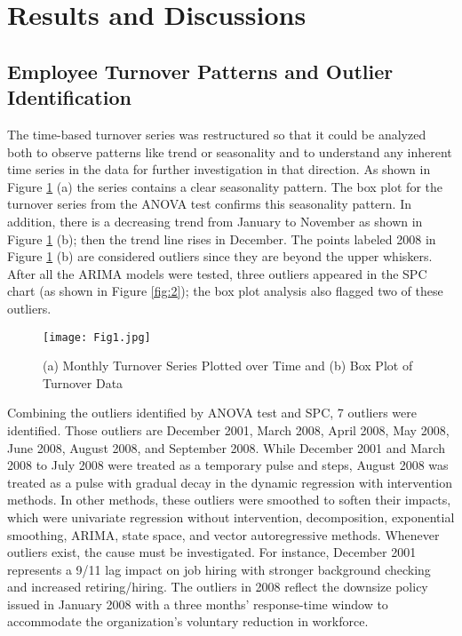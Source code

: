 \section{Results and Discussions}
\subsection{Employee Turnover Patterns and Outlier Identification}
The time-based turnover series was restructured so that it could be analyzed both to observe patterns like trend or seasonality and to understand any inherent time series in the data for further investigation in that direction. 
As shown in Figure \ref{fig:1} (a) the series contains a clear seasonality pattern. The box plot for the turnover series from the ANOVA test confirms this seasonality pattern. In addition, there is a decreasing trend from January to November as shown in Figure \ref{fig:1} (b); then the trend line rises in December. The points labeled  2008 in Figure \ref{fig:1} (b) are considered outliers since they are beyond the upper whiskers. After all the ARIMA models were tested, three outliers appeared in the SPC chart (as shown in Figure \ref{fig:2}); the box plot analysis also flagged two of these outliers. 

\begin{figure}[h!]
	\centering
	\texttt{[image: Fig1.jpg]}
	\caption{(a) Monthly Turnover Series Plotted over Time and (b) Box Plot of Turnover Data}
	\label{fig:1}
\end{figure}

Combining the outliers identified by ANOVA test and SPC, 7 outliers were identified. Those outliers are December 2001, March 2008, April 2008, May 2008, June 2008, August 2008, and September 2008. While December 2001 and March 2008 to July 2008 were treated as a temporary pulse and steps, August 2008 was treated as a pulse with gradual decay in the dynamic regression with intervention methods. In other methods, these outliers were smoothed to soften their impacts, which were univariate regression without intervention, decomposition, exponential smoothing, ARIMA, state space, and vector autoregressive methods. Whenever outliers exist, the cause must be investigated. For instance, December 2001 represents a 9/11 lag impact on job hiring with stronger background checking and increased retiring/hiring. The outliers in 2008 reflect the downsize policy issued in January 2008 with a three months' response-time window to accommodate the organization's voluntary reduction in workforce. 

